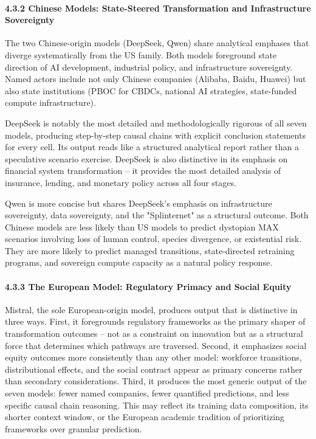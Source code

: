 \documentclass{article}
\begin{document}
\paragraph{4.3.2 Chinese Models: State-Steered Transformation and Infrastructure Sovereignty}

The two Chinese-origin models (DeepSeek, Qwen) share analytical emphases that diverge systematically from the US family. Both models foreground state direction of AI development, industrial policy, and infrastructure sovereignty. Named actors include not only Chinese companies (Alibaba, Baidu, Huawei) but also state institutions (PBOC for CBDCs, national AI strategies, state-funded compute infrastructure).

DeepSeek is notably the most detailed and methodologically rigorous of all seven models, producing step-by-step causal chains with explicit conclusion statements for every cell. Its output reads like a structured analytical report rather than a speculative scenario exercise. DeepSeek is also distinctive in its emphasis on financial system transformation -- it provides the most detailed analysis of insurance, lending, and monetary policy across all four stages.

Qwen is more concise but shares DeepSeek's emphasis on infrastructure sovereignty, data sovereignty, and the "Splinternet" as a structural outcome. Both Chinese models are less likely than US models to predict dystopian MAX scenarios involving loss of human control, species divergence, or existential risk. They are more likely to predict managed transitions, state-directed retraining programs, and sovereign compute capacity as a natural policy response.


\paragraph{4.3.3 The European Model: Regulatory Primacy and Social Equity}

Mistral, the sole European-origin model, produces output that is distinctive in three ways. First, it foregrounds regulatory frameworks as the primary shaper of transformation outcomes -- not as a constraint on innovation but as a structural force that determines which pathways are traversed. Second, it emphasizes social equity outcomes more consistently than any other model: workforce transitions, distributional effects, and the social contract appear as primary concerns rather than secondary considerations. Third, it produces the most generic output of the seven models: fewer named companies, fewer quantified predictions, and less specific causal chain reasoning. This may reflect its training data composition, its shorter context window, or the European academic tradition of prioritizing frameworks over granular prediction.
\end{document}
